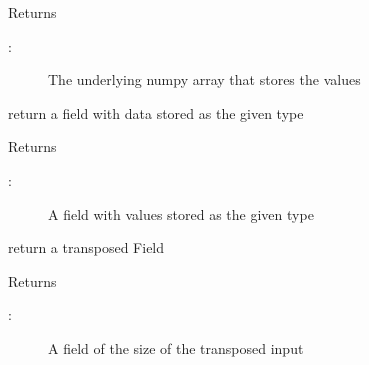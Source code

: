 \documentclass[letterpaper,10pt,english]{sphinxmanual}
\begin{document}
\begin{fulllineitems}
\begin{fulllineitems}
\sphinxAtStartPar
Returns
\begin{description}
\item[{:}] \leavevmode
\sphinxAtStartPar
The underlying numpy array that stores the values

\end{description}

\end{fulllineitems}


\begin{fulllineitems}
\label{\detokenize{autoapi/Field/index:Field.Field.astype}}
\sphinxAtStartPar
return a field with data stored as the given type

\sphinxAtStartPar
Returns
\begin{description}
\item[{:}] \leavevmode
\sphinxAtStartPar
A field with values stored as the given type

\end{description}

\end{fulllineitems}


\begin{fulllineitems}
\label{\detokenize{autoapi/Field/index:Field.Field.T}}
\sphinxAtStartPar
return a transposed Field

\sphinxAtStartPar
Returns
\begin{description}
\item[{:}] \leavevmode
\sphinxAtStartPar
A field of the size of the transposed input

\end{description}

\end{fulllineitems}


\begin{fulllineitems}
\label{\detokenize{autoapi/Field/index:Field.Field.__getitem__}}
\end{fulllineitems}


\end{fulllineitems}
\end{document}
